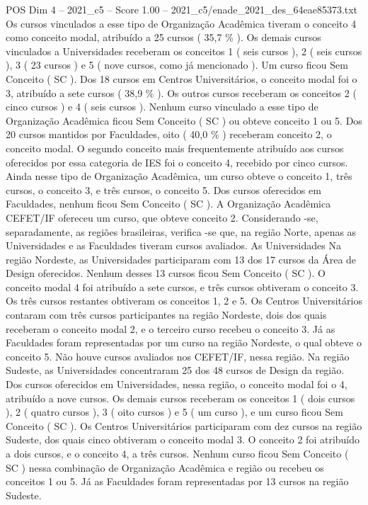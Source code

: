 \begin{textsample}{POS Dim 4 – 2021\_c5 – Score 1.00 – 2021\_c5/enade\_2021\_des\_64eae85373.txt}
Os cursos vinculados a esse tipo de Organização Acadêmica tiveram o conceito 4 como conceito modal, atribuído a 25 cursos ( 35,7 \% ).
Os demais cursos vinculados a Universidades receberam os conceitos 1 ( seis cursos ), 2 ( seis cursos ), 3 ( 23 cursos ) e 5 ( nove cursos, como já mencionado ).
Um curso ficou Sem Conceito ( SC ).
Dos 18 cursos em Centros Universitários, o conceito modal foi o 3, atribuído a sete cursos ( 38,9 \% ).
Os outros cursos receberam os conceitos 2 ( cinco cursos ) e 4 ( seis cursos ).
Nenhum curso vinculado a esse tipo de Organização Acadêmica ficou Sem Conceito ( SC ) ou obteve conceito 1 ou 5.
Dos 20 cursos mantidos por Faculdades, oito ( 40,0 \% ) receberam conceito 2, o conceito modal.
O segundo conceito mais frequentemente atribuído aos cursos oferecidos por essa categoria de IES foi o conceito 4, recebido por cinco cursos.
Ainda nesse tipo de Organização Acadêmica, um curso obteve o conceito 1, três cursos, o conceito 3, e três cursos, o conceito 5.
Dos cursos oferecidos em Faculdades, nenhum ficou Sem Conceito ( SC ).
A Organização Acadêmica CEFET/IF ofereceu um curso, que obteve conceito 2.
Considerando -se, separadamente, as regiões brasileiras, verifica -se que, na região Norte, apenas as Universidades e as Faculdades tiveram cursos avaliados.
As Universidades Na região Nordeste, as Universidades participaram com 13 dos 17 cursos da Área de Design oferecidos.
Nenhum desses 13 cursos ficou Sem Conceito ( SC ).
O conceito modal 4 foi atribuído a sete cursos, e três cursos obtiveram o conceito 3.
Os três cursos restantes obtiveram os conceitos 1, 2 e 5.
Os Centros Universitários contaram com três cursos participantes na região Nordeste, dois dos quais receberam o conceito modal 2, e o terceiro curso recebeu o conceito 3.
Já as Faculdades foram representadas por um curso na região Nordeste, o qual obteve o conceito 5.
Não houve cursos avaliados nos CEFET/IF, nessa região.
Na região Sudeste, as Universidades concentraram 25 dos 48 cursos de Design da região.
Dos cursos oferecidos em Universidades, nessa região, o conceito modal foi o 4, atribuído a nove cursos.
Os demais cursos receberam os conceitos 1 ( dois cursos ), 2 ( quatro cursos ), 3 ( oito cursos ) e 5 ( um curso ), e um curso ficou Sem Conceito ( SC ).
Os Centros Universitários participaram com dez cursos na região Sudeste, dos quais cinco obtiveram o conceito modal 3.
O conceito 2 foi atribuído a dois cursos, e o conceito 4, a três cursos.
Nenhum curso ficou Sem Conceito ( SC ) nessa combinação de Organização Acadêmica e região ou recebeu os conceitos 1 ou 5.
Já as Faculdades foram representadas por 13 cursos na região Sudeste.

\end{textsample}
